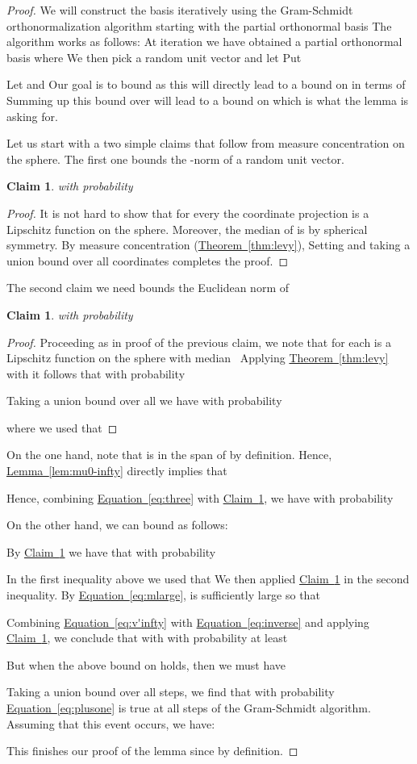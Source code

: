 \documentclass[letterpaper,11pt]{article}
\newtheorem{claim}[theorem]{Claim}
\theoremstyle{definition}
\newcommand{\claimlabel}[1]{\label{claim:#1}}
\newcommand{\claimref}[1]{\hyperref[claim:#1]{Claim~\ref{claim:#1}}}
\newcommand{\equationref}[1]{\hyperref[eq:#1]{Equation~\ref{eq:#1}}}
\newcommand{\lemmaref}[1]{\hyperref[lem:#1]{Lemma~\ref{lem:#1}}}
\newcommand{\theoremref}[1]{\hyperref[thm:#1]{Theorem~\ref{thm:#1}}}
\begin{document}
\begin{proof}
We will construct the basis iteratively using the Gram-Schmidt orthonormalization
algorithm starting with the partial orthonormal basis  The
algorithm works as follows: At
iteration  we have obtained a partial orthonormal basis 
where  We then pick a random unit vector  and
let  Put

Let  and 
Our goal is to bound  as this will directly lead to a bound
on  in terms of  Summing up this bound over  will
lead to a bound on  which is what the lemma is asking for.

Let us start with a two simple claims that follow from measure concentration
on the sphere. The first one bounds the -norm of a random unit
vector.
\begin{claim}\claimlabel{one}
 with probability

\end{claim}
\begin{proof}
It is not hard to show that for every  the coordinate projection
 is a Lipschitz function on the sphere. Moreover, the median of
 is  by spherical symmetry. By measure
concentration (\theoremref{levy}),  Setting 
and taking a union bound over all  coordinates completes the proof.
\end{proof}

The second claim we need bounds the Euclidean norm of 

\begin{claim}\claimlabel{two}
 with probability 
\end{claim}
\begin{proof}
Proceeding as in proof of the previous claim, we note that for each 
 is a Lipschitz function on the sphere with
median~ Applying \theoremref{levy} with  it follows that with probability 

Taking a union bound over all
 we have with probability 

where we used that 
\end{proof}

On the one hand, note
that  is in the span of  by definition. Hence,
\lemmaref{mu0-infty} directly implies
that

Hence, combining \equationref{three} with \claimref{two},
we have with probability 

On the other hand, we can bound  as follows:

By \claimref{two} we have that with probability 

In the first inequality above we used that 
We then applied \claimref{two} in the second inequality.
By \equationref{mlarge},  is sufficiently large so that


Combining \equationref{v'infty} with \equationref{inverse} and applying
\claimref{one}, we conclude that with
with probability at least 

But when the above bound on  holds, then we must
have

Taking a union bound over all  steps, we find that with probability
 \equationref{plusone} is true at all steps of the Gram-Schmidt
algorithm. Assuming that this event occurs, we have:

This finishes our proof of the lemma since  by
definition.
\end{proof}
\end{document}
